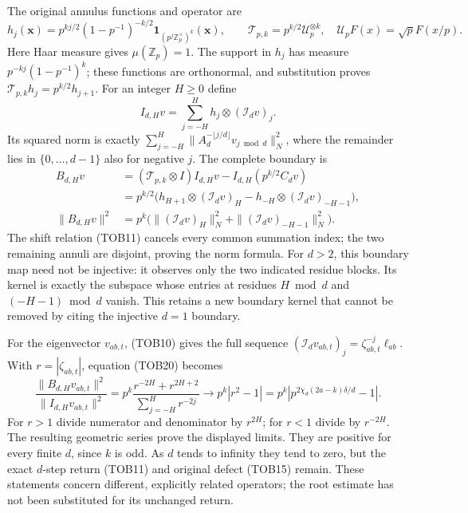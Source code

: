 The original annulus functions and operator are
\begin{equation}\tag{TOB18}
 h_j(\mathbf x)=p^{kj/2}(1-p^{-1})^{-k/2}
       \mathbf1_{(p^j\mathbb Z_p^\times)^k}(\mathbf x),\qquad
 \mathscr T_{p,k}=p^{k/2}\mathscr U_p^{\otimes k},
 \quad \mathscr U_pF(x)=\sqrt p F(x/p).
\end{equation}
Here Haar measure gives $\mu(\mathbb Z_p)=1$. The support in
$h_j$ has measure $p^{-kj}(1-p^{-1})^k$; these functions are
orthonormal, and substitution proves
$\mathscr T_{p,k}h_j=p^{k/2}h_{j+1}$.
For an integer $H\ge0$ define
\begin{equation}\tag{TOB19}
 I_{d,H}v=\sum_{j=-H}^Hh_j\otimes(\mathcal I_dv)_j.
\end{equation}
Its squared norm is exactly
$\sum_{j=-H}^H\|A_d^{-\lfloor j/d\rfloor}v_{j\bmod d}\|_N^2$,
where the remainder lies in $\{0,\ldots,d-1\}$ also for negative
$j$. The complete boundary is
\begin{equation}\tag{TOB20}
\begin{split}
 B_{d,H}v&=(\mathscr T_{p,k}\otimes I)I_{d,H}v
                       -I_{d,H}(p^{k/2}C_dv)\\
 &=p^{k/2}\bigl(h_{H+1}\otimes(\mathcal I_dv)_H
                  -h_{-H}\otimes(\mathcal I_dv)_{-H-1}\bigr),\\
 \|B_{d,H}v\|^2&=p^k\bigl(
       \|(\mathcal I_dv)_H\|_N^2+
       \|(\mathcal I_dv)_{-H-1}\|_N^2\bigr).
\end{split}
\end{equation}
The shift relation (TOB11) cancels every common summation index;
the two remaining annuli are disjoint, proving the norm formula.
For $d>2$, this boundary map need not be injective: it observes
only the two indicated residue blocks. Its kernel is exactly the
subspace whose entries at residues $H\bmod d$ and
$(-H-1)\bmod d$ vanish. This retains a new boundary kernel that
cannot be removed by citing the injective $d=1$ boundary.

For the eigenvector $v_{ab,t}$, (TOB10) gives the full sequence
$(\mathcal I_dv_{ab,t})_j=\zeta_{ab,t}^{-j}\ell_{ab}$.
With $r=|\zeta_{ab,t}|$, equation (TOB20) becomes
\begin{equation}\tag{TOB21}
 \frac{\|B_{d,H}v_{ab,t}\|^2}{\|I_{d,H}v_{ab,t}\|^2}
 =p^k\frac{r^{-2H}+r^{2H+2}}{\sum_{j=-H}^Hr^{-2j}}
 \longrightarrow p^k|r^2-1|
 =p^k\left|p^{2\chi_d(2a-k)\delta/d}-1\right|.
\end{equation}
For $r>1$ divide numerator and denominator by $r^{2H}$; for
$r<1$ divide by $r^{-2H}$. The resulting geometric series prove
the displayed limits. They are positive for every finite $d$,
since $k$ is odd. As $d$ tends to infinity they tend to zero, but
the exact $d$-step return (TOB11) and original defect (TOB15)
remain. These statements concern different, explicitly related
operators; the root estimate has not been substituted for its
unchanged return.

